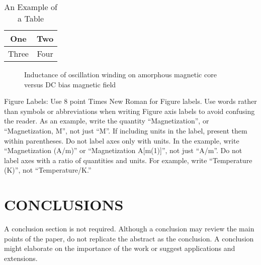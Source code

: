 \documentclass[a4paper, 10pt, conference]{ieeeconf}
\begin{document}
    \begin{table}[h]
    \caption{An Example of a Table}
    \label{table_example}
    \begin{center}
    \begin{tabular}{|c||c|}
    \hline
    One & Two\\
    \hline
    Three & Four\\
    \hline
    \end{tabular}
    \end{center}
    \end{table}


       \begin{figure}[thpb]
          \centering
          \caption{Inductance of oscillation winding on amorphous
           magnetic core versus DC bias magnetic field}
          \label{figurelabel}
       \end{figure}
       

    Figure Labels: Use 8 point Times New Roman for Figure labels. Use words rather than symbols or abbreviations when writing Figure axis labels to avoid confusing the reader. As an example, write the quantity ``Magnetization'', or ``Magnetization, M'', not just ``M''. If including units in the label, present them within parentheses. Do not label axes only with units. In the example, write ``Magnetization (A/m)'' or ``Magnetization {A[m(1)]}'', not just ``A/m''. Do not label axes with a ratio of quantities and units. For example, write ``Temperature (K)'', not ``Temperature/K.''

    \section{CONCLUSIONS}

    A conclusion section is not required. Although a conclusion may review the main points of the paper, do not replicate the abstract as the conclusion. A conclusion might elaborate on the importance of the work or suggest applications and extensions. 

    \addtolength{\textheight}{-12cm}   %
\end{document}
